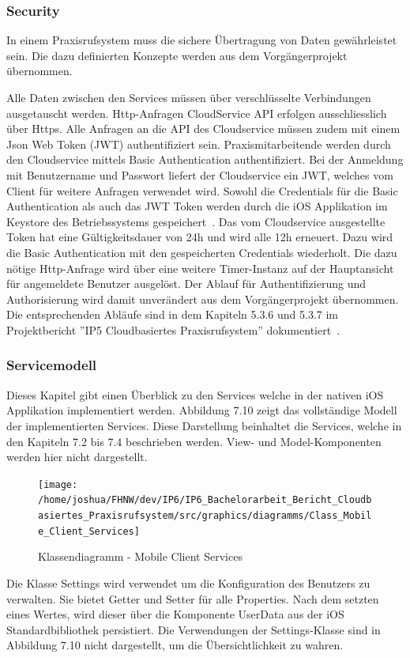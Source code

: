 \subsubsection{Security}

In einem Praxisrufsystem muss die sichere Übertragung von Daten gewährleistet sein.
Die dazu definierten Konzepte werden aus dem Vorgängerprojekt übernommen.

Alle Daten zwischen den Services müssen über verschlüsselte Verbindungen ausgetauscht werden.
Http-Anfragen CloudService API erfolgen ausschliesslich über Https\@.
Alle Anfragen an die API des Cloudservice müssen zudem mit einem Json Web Token (JWT) authentifiziert sein.
Praxismitarbeitende werden durch den Cloudservice mittels Basic Authentication authentifiziert.
Bei der Anmeldung mit Benutzername und Passwort liefert der Cloudservice ein JWT, welches vom Client für weitere Anfragen verwendet wird.
Sowohl die Credentials für die Basic Authentication als auch das JWT Token werden durch die iOS Applikation im Keystore des Betriebssystems gespeichert~\cite{ip5}.
Das vom Cloudservice ausgestellte Token hat eine Gültigkeitsdauer von 24h und wird alle 12h erneuert.
Dazu wird die Basic Authentication mit den gespeicherten Credentials wiederholt.
Die dazu nötige Http-Anfrage wird über eine weitere Timer-Instanz auf der Hauptansicht für angemeldete Benutzer ausgelöst.
Der Ablauf für Authentifizierung und Authorisierung wird damit unverändert aus dem Vorgängerprojekt übernommen.
Die entsprechenden Abläufe sind in dem Kapiteln 5.3.6 und 5.3.7 im Projektbericht ''IP5 Cloudbasiertes Praxisrufsystem'' dokumentiert~\cite{ip5}.

\clearpage

\subsubsection{Servicemodell}

Dieses Kapitel gibt einen Überblick zu den Services welche in der nativen iOS Applikation implementiert werden.
Abbildung 7.10 zeigt das vollständige Modell der implementierten Services.
Diese Darstellung beinhaltet die Services, welche in den Kapiteln 7.2 bis 7.4 beschrieben werden.
View- und Model-Komponenten werden hier nicht dargestellt.

\begin{figure}[h]
    \centering
    \begin{minipage}[b]{1\textwidth}
        \texttt{[image: /home/joshua/FHNW/dev/IP6/IP6\_Bachelorarbeit\_Bericht\_Cloudbasiertes\_Praxisrufsystem/src/graphics/diagramms/Class\_Mobile\_Client\_Services]}
        \caption{Klassendiagramm - Mobile Client Services}
    \end{minipage}
\end{figure}

Die Klasse Settings wird verwendet um die Konfiguration des Benutzers zu verwalten.
Sie bietet Getter und Setter für alle Properties.
Nach dem setzten eines Wertes, wird dieser über die Komponente UserData aus der iOS Standardbibliothek persistiert.
Die Verwendungen der Settings-Klasse sind in Abbildung 7.10 nicht dargestellt, um die Übersichtlichkeit zu wahren.

\clearpage
